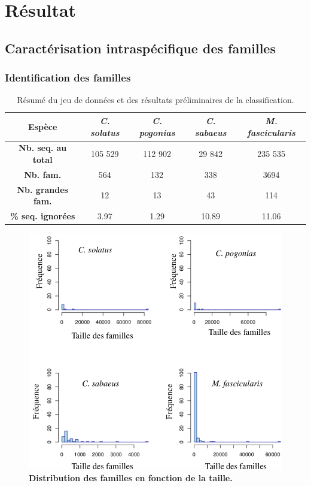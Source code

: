 \documentclass[12pt,a4paper]{article}
\begin{document}
\section{Résultat}
	\subsection{Caractérisation intraspécifique des familles}
			\subsubsection{Identification des familles}
		
		\begin{table}
			\center
			\begin{tabular}{|c|c|c|c|c|}
   			\hline
  			\textbf{Espèce} & \textit{C. solatus} & \textit{C. pogonias} & \textit{C. sabaeus} & \textit{M. fascicularis}\\
		    \hline
   			\textbf{Nb. seq. au total} & 105 529 & 112 902 & 29 842 & 235 535 \\
   			\hline
   			\textbf{Nb. fam.} & 564 & 132 & 338 & 3694\\
   			\hline
   			\textbf{Nb. grandes fam.} & 12 & 13 & 43 & 114\\
   			\hline
   			\textbf{\% seq. ignorées} & 3.97 & 1.29 & 10.89 & 11.06\\
   			\hline
			\end{tabular}
			\caption{Résumé du jeu de données et des résultats préliminaires de la classification.}
			\label{tab_res}
		\end{table}
		
		\begin{figure}
			\center
			\includegraphics[scale=0.45]{img/distribution_familles.png}
			\caption{\textbf{Distribution des familles en fonction de la taille.}}
			\label{dist_fam} 
		\end{figure}
\end{document}
